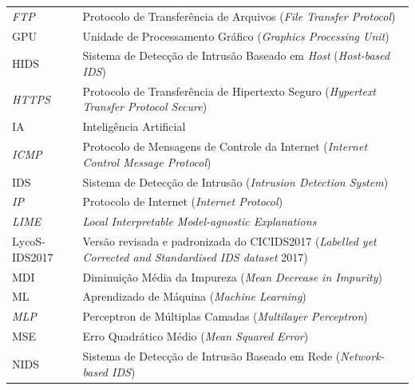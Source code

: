 \begin{longtable}{@{}p{3.8cm}p{\dimexpr\textwidth-3.8cm\relax}@{}}
    \textit{FTP}   & Protocolo de Transferência de Arquivos (\textit{File Transfer Protocol})                                        \\[4pt]
    GPU            & Unidade de Processamento Gráfico (\textit{Graphics Processing Unit})                                            \\[4pt]
    HIDS           & Sistema de Detecção de Intrusão Baseado em \textit{Host} (\textit{Host-based IDS})                              \\[4pt]
    \textit{HTTPS} & Protocolo de Transferência de Hipertexto Seguro (\textit{Hypertext Transfer Protocol Secure})                   \\[4pt]
    IA             & Inteligência Artificial                                                                                         \\[4pt]
    \textit{ICMP}  & Protocolo de Mensagens de Controle da Internet (\textit{Internet Control Message Protocol})                     \\[4pt]
    IDS            & Sistema de Detecção de Intrusão (\textit{Intrusion Detection System})                                           \\[4pt]
    \textit{IP}    & Protocolo de Internet (\textit{Internet Protocol})                                                              \\[4pt]
    \textit{LIME}  & \textit{Local Interpretable Model-agnostic Explanations}                                                        \\[4pt]
    LycoS-IDS2017  & Versão revisada e padronizada do CICIDS2017 (\textit{Labelled yet Corrected and Standardised IDS dataset} 2017) \\[4pt]
    MDI            & Diminuição Média da Impureza (\textit{Mean Decrease in Impurity})                                               \\[4pt]
    ML             & Aprendizado de Máquina (\textit{Machine Learning})                                                              \\[4pt]
    \textit{MLP}   & Perceptron de Múltiplas Camadas (\textit{Multilayer Perceptron})                                                \\[4pt]
    MSE            & Erro Quadrático Médio (\textit{Mean Squared Error})                                                             \\[4pt]
    NIDS           & Sistema de Detecção de Intrusão Baseado em Rede (\textit{Network-based IDS})                                    \\[4pt]

\end{longtable}
